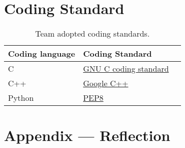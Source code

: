 \documentclass{article}
\begin{document}
\section{Coding Standard}\label{sec:coding_standards}

\begin{table}[h!]
\centering
\begin{tabularx}{\textwidth}{|l|X|X|}
\hline
\textbf{Coding language} & \textbf{Coding Standard} \\ \hline
C & \href{https://www.gnu.org/prep/standards/html_node/Writing-C.html}{GNU C coding standard} \\ \hline
C++ & \href{https://google.github.io/styleguide/cppguide.html}{Google C++} \\ \hline
Python & \href{https://peps.python.org/pep-0008/}{PEP8} \\ \hline
\end{tabularx}
\caption{Team adopted coding standards.}
\end{table}

\newpage{}

\section*{Appendix --- Reflection}



\end{document}
